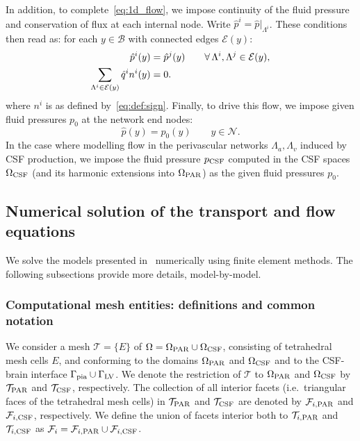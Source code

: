 In addition, to complete~\eqref{eq:1d_flow}, we impose continuity of
the fluid pressure and conservation of flux at each internal node. Write
$\hat{p}^i = \hat{p}|_{\Lambda^i}$. These conditions then read as: for
each $y \in \mathcal{B}$ with connected edges $\mathcal{E}(y)$:
\begin{subequations}
\begin{align}
  \hat{p}^i(y) &= \hat{p}^j(y) \qquad \forall \, \Lambda^i, \Lambda^j \in \mathcal{E}(y), \\
  \sum_{\Lambda^i \in \mathcal{E}(y)} \hat{q}^i n^i(y) &= 0  .
\end{align}
\label{eq:1d_flow:bifurcations}
\end{subequations}
where $n^i$ is as defined by~\eqref{eq:def:sign}. Finally, to drive this flow, we impose given fluid pressures $p_0$ at the
network end nodes:
\begin{equation}
  \hat{p}(y) = p_0(y) \qquad y \in \mathcal{N} .
  \label{eq:1d_flow:bcs}
\end{equation}
In the case where modelling flow in the perivascular networks
$\Lambda_a, \Lambda_v$ induced by CSF production, we impose the fluid
pressure $p_{\rm CSF}$ computed in the CSF spaces $\Omega_{\rm CSF}$
(and its harmonic extensions into $\Omega_{\rm PAR}$) as the given
fluid pressures $p_0$.

\subsection{Numerical solution of the transport and flow equations}
\label{sec:details_numerical_method}

We solve the models presented in~ numerically
using finite element methods. The following subsections provide more
details, model-by-model.

\subsubsection{Computational mesh entities: definitions and common notation}

We consider a mesh $\mathcal{T} = \{ E \}$ of $\Omega = \Omega_{\rm
  PAR} \cup \Omega_{\rm CSF}$, consisting of tetrahedral mesh cells
$E$, and conforming to the domains $\Omega_{\rm PAR}$ and $\Omega_{\rm
  CSF}$ and to the CSF-brain interface $\Gamma_{\rm pia} \cup
\Gamma_{\rm LV}$. We denote the restriction of $\mathcal{T}$ to
$\Omega_{\rm PAR}$ and $\Omega_{\rm CSF}$ by $\mathcal{T}_{\rm PAR}$
and $\mathcal{T}_{\rm CSF}$, respectively. The collection of all
interior facets (i.e.~triangular faces of the tetrahedral mesh cells)
in $\mathcal{T}_{\rm PAR}$ and $\mathcal{T}_{\rm CSF}$ are denoted by
$\mathcal{F}_{i, \rm PAR}$ and $\mathcal{F}_{i, \rm CSF}$,
respectively. We define the union of facets interior both to
$\mathcal{T}_{i, \rm PAR}$ and $\mathcal{T}_{i, \rm CSF}$ as
$\mathcal{F}_i = \mathcal{F}_{i, \rm PAR} \cup \mathcal{F}_{i, \rm
  CSF}$. 

